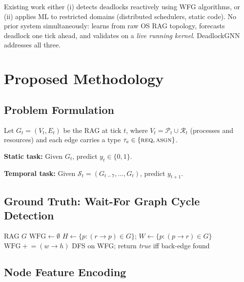 \documentclass[conference]{IEEEtran}
\begin{document}
Existing work either (i) detects deadlocks reactively using WFG algorithms, or
(ii) applies ML to restricted domains (distributed schedulers, static code).
No prior system simultaneously: learns from raw OS RAG topology, forecasts
deadlock one tick ahead, and validates on a \emph{live running kernel}. DeadlockGNN
addresses all three.

\section{Proposed Methodology}

\subsection{Problem Formulation}

Let $G_t = (V_t, E_t)$ be the RAG at tick $t$, where $V_t = \mathcal{P}_t
\cup \mathcal{R}_t$ (processes and resources) and each edge carries a type
$\tau_e \in \{\textsc{req}, \textsc{asgn}\}$.

\noindent\textbf{Static task:} Given $G_t$, predict $y_t \in \{0,1\}$.

\noindent\textbf{Temporal task:} Given $\mathcal{S}_t = (G_{t-7}, \ldots, G_t)$,
predict $y_{t+1}$.

\subsection{Ground Truth: Wait-For Graph Cycle Detection}

\begin{algorithm}[H]
\caption{Deadlock Detection via WFG}
\begin{algorithmic}[1]
\REQUIRE RAG $G$
\STATE $\text{WFG} \leftarrow \emptyset$
  \STATE $H \leftarrow \{p : (r \to p) \in G\}$;\quad
         $W \leftarrow \{p : (p \to r) \in G\}$
    \STATE $\text{WFG} \mathrel{+}= (w \to h)$
  \ENDFOR
\ENDFOR
\STATE DFS on WFG; return \textit{true} iff back-edge found
\end{algorithmic}
\end{algorithm}

\subsection{Node Feature Encoding}
\end{document}
